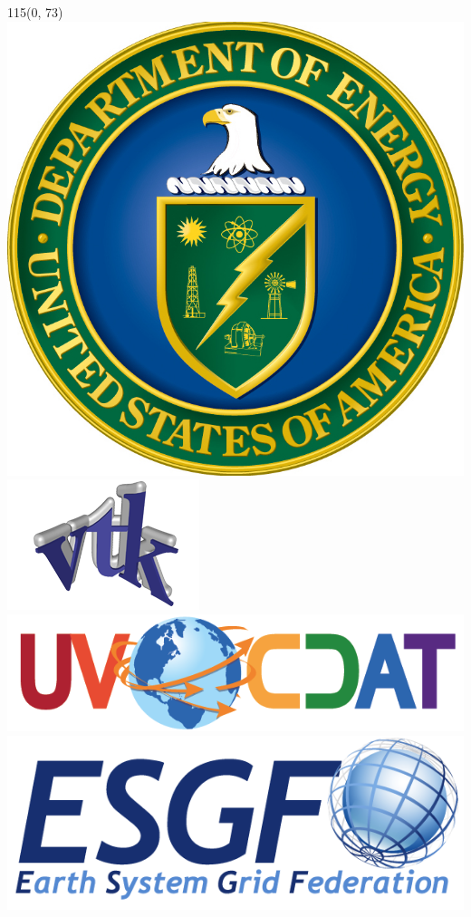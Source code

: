 \documentclass[a0,landscape]{a0poster}
\begin{document}
\begin{textblock}{115}(0, 73)
\includegraphics[height=0.04\hsize]{images/doe-logo}
\hspace{0.3cm}
\includegraphics[height=0.04\hsize]{images/VTK_logo}
\hspace{0.3cm}
\includegraphics[height=0.04\hsize]{images/UV-CDAT_logo}
\hspace{0.3cm}
\includegraphics[height=0.04\hsize]{images/esgf_1}
\hspace{0.3cm}
\end{textblock}
\end{document}
